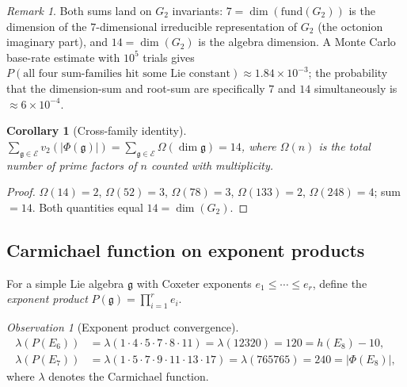 \documentclass[11pt]{amsart}
\theoremstyle{plain}
\newtheorem{corollary}[theorem]{Corollary}
\theoremstyle{definition}
\theoremstyle{remark}
\newtheorem{remark}[theorem]{Remark}
\newtheorem{observation}[theorem]{Observation}
\newcommand{\fg}{\mathfrak{g}}
\renewcommand{\Phi}{\varPhi}
\begin{document}
\begin{remark}
  Both sums land on $G_2$ invariants: $7 = \dim(\mathrm{fund}(G_2))$ is the
  dimension of the $7$-dimensional irreducible representation of $G_2$
  (the octonion imaginary part), and $14 = \dim(G_2)$ is the algebra
  dimension.  A Monte Carlo base-rate estimate with $10^5$ trials gives
  $P(\text{all four sum-families hit some Lie constant}) \approx 1.84\times 10^{-3}$;
  the probability that the dimension-sum and root-sum are specifically
  $7$ and $14$ simultaneously is $\approx 6\times 10^{-4}$.
\end{remark}

\begin{corollary}[Cross-family identity]\label{cor:v2-cross}
  $\displaystyle\sum_{\fg\in\mathcal{E}} v_2(|\Phi(\fg)|)
  = \sum_{\fg\in\mathcal{E}} \Omega(\dim\fg) = 14$,
  where $\Omega(n)$ is the total number of prime factors of $n$
  counted with multiplicity.
\end{corollary}

\begin{proof}
  $\Omega(14)=2$, $\Omega(52)=3$, $\Omega(78)=3$, $\Omega(133)=2$,
  $\Omega(248)=4$; sum $= 14$.  Both quantities equal $14 = \dim(G_2)$.
\end{proof}

\subsection{Carmichael function on exponent products}
\label{subsec:carmichael-exp}

For a simple Lie algebra $\fg$ with Coxeter exponents $e_1 \le \cdots \le e_r$,
define the \emph{exponent product} $P(\fg) = \prod_{i=1}^r e_i$.

\begin{observation}[Exponent product convergence]\label{obs:carmichael-exp}
  \begin{align*}
    \lambda(P(E_6)) &= \lambda(1\cdot 4\cdot 5\cdot 7\cdot 8\cdot 11)
                     = \lambda(12320) = 120 = h(E_8) - 10,\\
    \lambda(P(E_7)) &= \lambda(1\cdot 5\cdot 7\cdot 9\cdot 11\cdot 13\cdot 17)
                     = \lambda(765765) = 240 = |\Phi(E_8)|,
  \end{align*}
  where $\lambda$ denotes the Carmichael function.
\end{observation}
\end{document}

